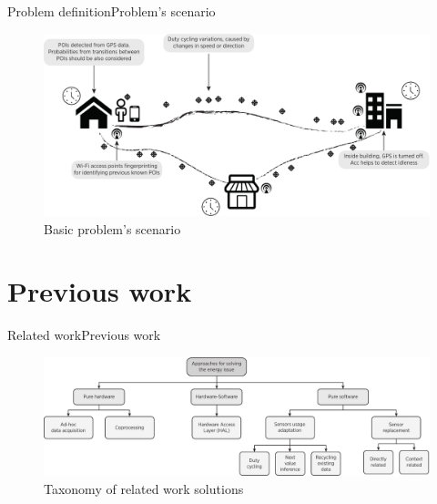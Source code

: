 \documentclass[10pt,xcolor={dvipsnames},handout]{beamer}
\begin{document}
\begin{frame}{Problem definition}{Problem's scenario}
\begin{figure}
  \centering
  \includegraphics[width=\textwidth]{vectors/scenario}
  \caption{Basic problem's scenario}
  \label{fig:scenario}
\end{figure}
\end{frame}

\section{Previous work}
\begin{frame}{Related work}{Previous work}
\begin{figure}
  \centering
  \includegraphics[width=\textwidth]{../../../resources/images/vectors/approaches-taxonomy}
  \caption{Taxonomy of related work solutions}
  \label{fig:taxonomy}
\end{figure}
\end{frame}
\end{document}
